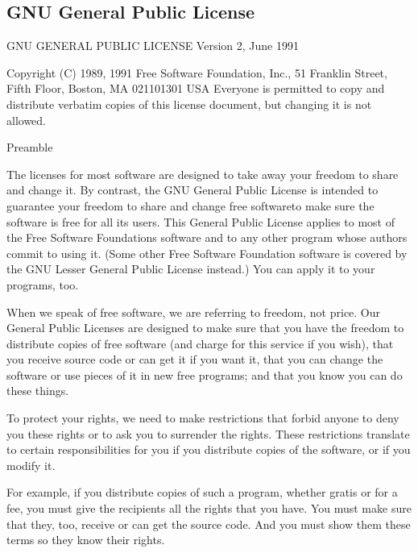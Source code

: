 \documentclass[letterpaper,10pt,english,openany,oneside]{sphinxmanual}
\begin{document}
\subsection{GNU General Public License}
\label{\detokenize{docs/licenses:gpl}}\label{\detokenize{docs/licenses:id1}}
\begin{sphinxVerbatim}[commandchars=\\\{\}]
                    GNU GENERAL PUBLIC LICENSE
                       Version 2, June 1991

 Copyright (C) 1989, 1991 Free Software Foundation, Inc.,
 51 Franklin Street, Fifth Floor, Boston, MA 02110\PYGZhy{}1301 USA
 Everyone is permitted to copy and distribute verbatim copies
 of this license document, but changing it is not allowed.

                            Preamble

  The licenses for most software are designed to take away your
freedom to share and change it.  By contrast, the GNU General Public
License is intended to guarantee your freedom to share and change free
software\PYGZhy{}\PYGZhy{}to make sure the software is free for all its users.  This
General Public License applies to most of the Free Software
Foundation\PYGZsq{}s software and to any other program whose authors commit to
using it.  (Some other Free Software Foundation software is covered by
the GNU Lesser General Public License instead.)  You can apply it to
your programs, too.

  When we speak of free software, we are referring to freedom, not
price.  Our General Public Licenses are designed to make sure that you
have the freedom to distribute copies of free software (and charge for
this service if you wish), that you receive source code or can get it
if you want it, that you can change the software or use pieces of it
in new free programs; and that you know you can do these things.

  To protect your rights, we need to make restrictions that forbid
anyone to deny you these rights or to ask you to surrender the rights.
These restrictions translate to certain responsibilities for you if you
distribute copies of the software, or if you modify it.

  For example, if you distribute copies of such a program, whether
gratis or for a fee, you must give the recipients all the rights that
you have.  You must make sure that they, too, receive or can get the
source code.  And you must show them these terms so they know their
rights.


\end{sphinxVerbatim}
\end{document}
